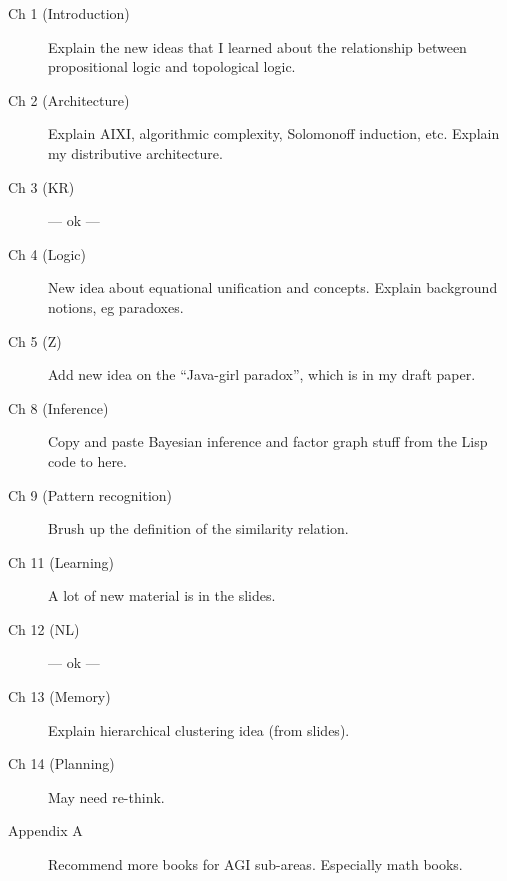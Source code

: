 \documentclass[12pt, a4paper]{report}
\theoremstyle{examples} \newtheorem{example}{Example}[section]
\begin{document}
\begin{description}

\item[Ch 1 (Introduction)]  Explain the new ideas that I learned about the relationship between propositional logic and topological logic.

\item[Ch 2 (Architecture)]  Explain AIXI, algorithmic complexity, Solomonoff induction, etc.  Explain my distributive architecture.

\item[Ch 3 (KR)] --- ok ---

\item[Ch 4 (Logic)]  New idea about equational unification and concepts.  Explain background notions, eg paradoxes.

\item[Ch 5 (Z)]  Add new idea on the ``Java-girl paradox'', which is in my draft paper.

\item[Ch 8 (Inference)]  Copy and paste Bayesian inference and factor graph stuff from the Lisp code to here.

\item[Ch 9 (Pattern recognition)]  Brush up the definition of the similarity relation.

\item[Ch 11 (Learning)]  A lot of new material is in the slides.

\item[Ch 12 (NL)] --- ok ---

\item[Ch 13 (Memory)]  Explain hierarchical clustering idea (from slides).

\item[Ch 14 (Planning)]  May need re-think.

\item[Appendix A]  Recommend more books for AGI sub-areas.  Especially math books.

\end{description}

\color{black}

\tableofcontents





















\end{document}
